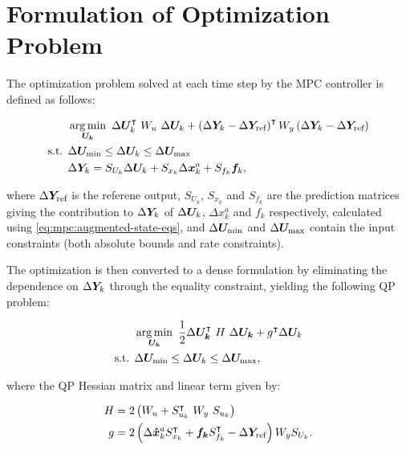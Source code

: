 \section{Formulation of Optimization Problem}
\label{sec:mpc:optimization}

The optimization problem solved at each time step by the MPC controller is defined as follows:

\begin{equation}
  \begin{split}
    & \operatorname*{arg\,min}_{\bm{U_k}}\ \Delta \bm{U}_k^\intercal\ W_u\ \Delta \bm{U}_k + \left( \Delta\bm{Y}_k - \Delta\bm{Y}_\text{ref} \right)^\intercal W_y \left( \Delta\bm{Y}_k - \Delta\bm{Y}_\text{ref} \right)\\
    \text{s.t. } & \Delta \bm{U}_\text{min} \leq \Delta \bm{U}_k \leq \Delta \bm{U}_\text{max}\\
    & \Delta \bm{Y}_k = S_{U_k} \Delta \bm{U}_k + S_{x_k} \Delta \bm{x}_k^a + S_{f_k} \bm{f}_k,
  \end{split}
\end{equation}
    
\noindent where $\Delta \bm{Y}_\text{ref}$ is the referene output, $S_{U_k}$, $S_{x_k}$ and $S_{f_k}$ are the prediction matrices giving the contribution to $\Delta \bm{Y}_k$ of $\Delta \bm{U}_k$, $\Delta x_k^a$ and $f_k$ respectively, calculated using \eqref{eq:mpc:augmented-state-eqs}, and $\Delta \bm{U}_\text{min}$ and $\Delta \bm{U}_\text{max}$ contain the input constraints (both absolute bounds and rate constraints).

The optimization is then converted to a dense formulation by eliminating the dependence on $\Delta \bm{Y}_k$ through the equality constraint, yielding the following QP problem:

\begin{equation}
  \begin{split}
    & \argmin_{\vc{U_k}}\ \frac{1}{2} \Delta\vc{U_k}^\intercal\ H\ \Delta\vc{U_k} + g^\intercal \Delta \vc{U}_k\\
    \text{s.t. } & \Delta \vc{U}\ut{min} \leq \Delta \vc{U}_k \leq \Delta \vc{U}\ut{max},
  \end{split}
  \label{eq:mpc:optimization-qp-formulation}
\end{equation}

\noindent where the QP Hessian matrix and linear term given by:

\begin{equation}
  \begin{split}
    H & = 2\left( W_u + S_{u_k}^\intercal\ W_y\ S_{u_k} \right)\\
    g & = 2\left( \Delta\bm{\hat{x}}_k^a S_{x_k}^\intercal + \bm{f_k} S_{f_k}^\intercal - \Delta \bm{Y}_\text{ref} \right)W_y S_{U_k}.
  \end{split}
  \label{eq:mpc:optimization-qp-terms}
\end{equation}


